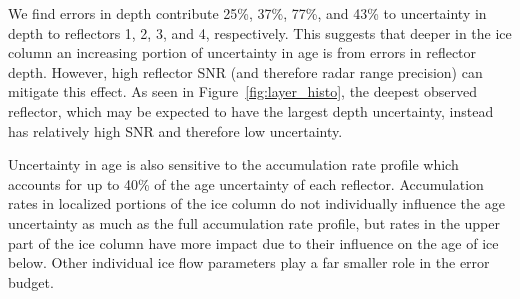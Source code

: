 We find errors in depth contribute 25\%, 37\%, 77\%, and 43\% to uncertainty in depth to reflectors 1, 2, 3, and 4, respectively. This suggests that deeper in the ice column an increasing portion of uncertainty in age is from errors in reflector depth. However, high reflector SNR (and therefore radar range precision) can mitigate this effect. As seen in Figure~\ref{fig:layer_histo}, the deepest observed reflector, which may be expected to have the largest depth uncertainty, instead has relatively high SNR and therefore low uncertainty.

Uncertainty in age is also sensitive to the accumulation rate profile which accounts for up to 40\% of the age uncertainty of each reflector. 
Accumulation rates in localized portions of the ice column do not individually influence the age uncertainty as much as the full accumulation rate profile, but rates in the upper part of the ice column have more impact due to their influence on the age of ice below. Other individual ice flow parameters play a far smaller role in the error budget.









